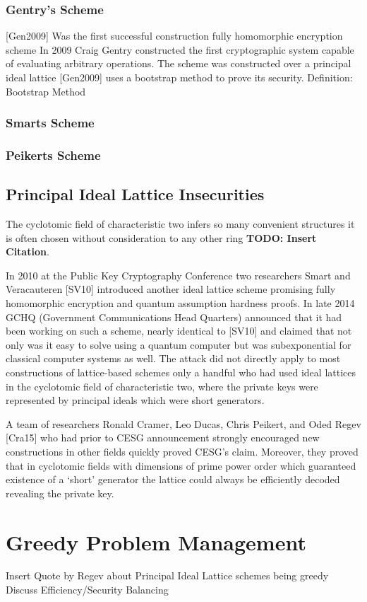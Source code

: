 \subsubsection{Gentry's Scheme}
[Gen2009] Was the first successful construction fully homomorphic encryption scheme In 2009 Craig Gentry constructed the first cryptographic system capable of evaluating arbitrary operations. The scheme was constructed over a principal ideal lattice [Gen2009] uses a bootstrap method to prove its security.
Definition: Bootstrap Method 

\subsubsection{Smarts Scheme}

\subsubsection{Peikerts Scheme}

\subsection{Principal Ideal Lattice Insecurities}

The cyclotomic field of characteristic two infers so many convenient structures it is often chosen without consideration to any other ring \textbf{TODO: Insert Citation}.

In 2010 at the Public Key Cryptography Conference two researchers Smart and Veracauteren [SV10] introduced another ideal lattice scheme promising fully homomorphic encryption and quantum assumption hardness proofs. In late 2014 GCHQ (Government Communications Head Quarters) announced that it had been working on such a scheme, nearly identical to [SV10] and claimed that not only was it easy to solve using a quantum computer but was subexponential for classical computer systems as well. The attack did not directly apply to most constructions of lattice-based schemes only a handful who had used ideal lattices in the cyclotomic field of characteristic two, where the private keys were represented by principal ideals which were short generators. 

A team of researchers Ronald Cramer, Leo Ducas, Chris Peikert, and Oded Regev [Cra15] who had prior to CESG announcement strongly encouraged new constructions in other fields quickly proved CESG’s claim. Moreover, they proved that in cyclotomic fields with dimensions of prime power order which guaranteed existence of a ‘short’ generator the lattice could always be efficiently decoded revealing the private key.

\section{Greedy Problem Management}

Insert Quote by Regev about Principal Ideal Lattice schemes being greedy 
Discuss Efficiency/Security Balancing

